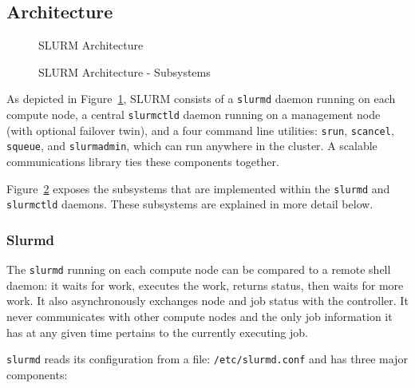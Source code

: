 \subsection{Architecture}

\begin{figure}[htb]
\centerline{}
\caption{SLURM Architecture}
\label{arch}
\end{figure}

\begin{figure}[htb]
\centerline{}
\caption{SLURM Architecture - Subsystems}
\label{archdetail}
\end{figure}


As depicted in Figure~\ref{arch}, SLURM consists of 
a {\tt slurmd} daemon running on each compute node, 
a central {\tt slurmctld} daemon running on a management node (with optional 
failover twin), 
and a four command line utilities: {\tt srun}, {\tt scancel}, {\tt squeue}, 
and {\tt slurmadmin}, which can run anywhere in the cluster.
A scalable communications library ties these components together.

Figure~\ref{archdetail} exposes the subsystems that are implemented within
the {\tt slurmd} and {\tt slurmctld} daemons.  These subsystems are explained
in more detail below.

\subsubsection{Slurmd}

The {\tt slurmd} running
on each compute node can be compared to a remote shell daemon:  it waits 
for work, executes the work, returns status, then waits for more work.  
It also asynchronously exchanges node and job status with the controller.  
It never communicates with other compute nodes and the only job information 
it has at any given time pertains to the currently executing job.

{\tt slurmd} reads its configuration from a file: {\tt /etc/slurmd.conf}
and has three major components:

